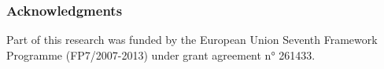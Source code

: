 \documentclass[runningheads,a4paper]{llncs}
\begin{document}
\subsubsection{Acknowledgments}
Part of this research was funded by the European Union Seventh Framework Programme (FP7/2007-2013) under grant agreement n° 261433. %





\end{document}
